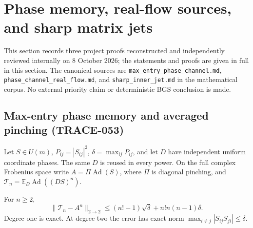 \section{Phase memory, real-flow sources, and sharp matrix jets}
\label{sec:phase-channel-jet}
This section records three project proofs reconstructed and independently
reviewed internally on 8 October 2026; the statements and proofs are
given in full in this section. The canonical sources are
\texttt{max\_entry\_phase\_channel.md},
\texttt{phase\_channel\_real\_flow.md}, and
\texttt{sharp\_inner\_jet.md} in the mathematical corpus. No external
priority claim or deterministic BGS conclusion is made.

\subsection{Max-entry phase memory and averaged pinching (TRACE-053)}
Let $S\in U(m)$, $P_{ij}=|S_{ij}|^2$, $\delta=\max_{ij}P_{ij}$,
and let $D$ have independent uniform coordinate phases. The same $D$ is
reused in every power. On the full complex Frobenius space write
$A=\Pi\operatorname{Ad}(S)$, where $\Pi$ is diagonal pinching, and
$\mathcal T_n=\mathbb E_D\operatorname{Ad}((DS)^n)$.
\begin{theorem}
For $n\ge2$,
\[
 \|\mathcal T_n-A^n\|_{2\to2}
 \le(n!-1)\sqrt\delta+n!n(n-1)\delta.
\]
Degree one is exact. At degree two the error has exact norm
$\max_{i\ne j}|S_{ij}S_{ji}|\le\delta$.
\end{theorem}
